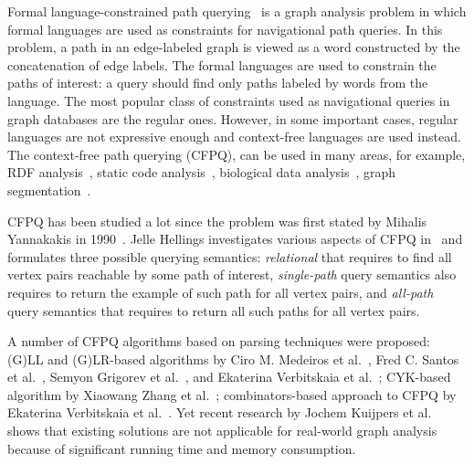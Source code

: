 \documentclass[sigconf, nonacm]{acmart}
\begin{document}
Formal language-constrained path querying~\cite{doi:10.1137/S0097539798337716} is a graph analysis problem in which formal languages are used as constraints for
navigational path queries. In this problem, a path in an edge-labeled graph is viewed
as a word constructed by the concatenation of edge labels. The formal languages are used to constrain the paths of interest: a query should find only paths labeled by words from the language. The most popular class of constraints used as navigational queries in graph databases are the regular ones.
However, in some important cases, regular languages are not expressive enough and context-free languages are used instead. The context-free path querying (CFPQ), can be used in many areas, for example, RDF analysis~\cite{10.1007/978-3-319-46523-4_38}, static code analysis~\cite{Zheng,10.1145/373243.360208}, biological data analysis~\cite{SubgraphQueriesbyContextfreeGrammars}, graph segmentation~\cite{8731467}.

CFPQ has been studied a lot since the problem was first stated by Mihalis Yannakakis in 1990~\cite{Yannakakis}.
Jelle Hellings investigates various aspects of CFPQ in~\cite{hellingsPathQuerying,hellingsRelational,DBLP:journals/corr/Hellings15} and formulates three possible querying semantics: \textit{relational} that requires to find all vertex pairs reachable by some path of interest, \textit{single-path} query semantics also requires to return the example of such path for all vertex pairs, and \textit{all-path} query semantics that requires to return all such paths for all vertex pairs.

A number of CFPQ algorithms based on parsing techniques were proposed: (G)LL and (G)LR-based algorithms by Ciro M. Medeiros et al.~\cite{Medeiros:2018:EEC:3167132.3167265}, Fred C. Santos et al.~\cite{10.1007/978-3-319-91662-0_17}, Semyon Grigorev et al.~\cite{Grigorev:2017:CPQ:3166094.3166104}, and Ekaterina Verbitskaia et al.~\cite{10.1007/978-3-319-41579-6_22}; CYK-based algorithm by Xiaowang Zhang et al.~\cite{10.1007/978-3-319-46523-4_38}; combinators-based approach to CFPQ by Ekaterina Verbitskaia et al.~\cite{Verbitskaia:2018:PCC:3241653.3241655}.
Yet recent research by Jochem Kuijpers et al.~\cite{Kuijpers:2019:ESC:3335783.3335791} shows that existing solutions are not applicable for real-world graph analysis because of significant
running time and memory consumption.
\end{document}
